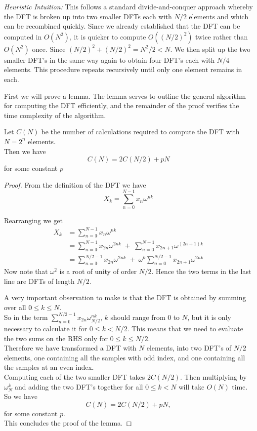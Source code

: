 \noindent\textit{Heuristic Intuition:}\lvm
This follows a standard divide-and-conquer approach whereby the DFT is broken up into two smaller DFTs each with $N/2$ elements and which can be recombined quickly. Since we already established that the DFT can be computed in $O(N^2)$, it is quicker to compute $O((N/2)^2)$ twice rather than $O(N^2)$ once. Since $(N/2)^2 + (N/2)^2 = N^2/2 < N$. We then split up the two smaller DFT's in the same way again to obtain four DFT's each with $N/4$ elements. This procedure repeats recursively until only one element remains in each.

First we will prove a lemma. The lemma serves to outline the general algorithm for computing the DFT efficiently, and the remainder of the proof verifies the time complexity of the algorithm.

\begin{lemma}
    Let $C(N)$ be the number of calculations required to compute the DFT with $N = 2^n$ elements.\\
    Then we have
    \begin{equation}
        C(N) = 2 C(N/2) + pN \label{eq:fftlem}
    \end{equation}
    for some constant $p$
\end{lemma}

\begin{proof}
From the definition of the DFT we have
\[
    X_k = \sum^{N-1}_{n=0}x_n\omega^{nk}
\]

Rearranging we get
\begin{align}
    X_k
    &= \sum^{N-1}_{n=0}x_n\omega^{nk} \nonumber\\
    &= \sum^{N-1}_{n=0}x_{2n}\omega^{2nk} \;+\; \sum^{N-1}_{n=0}x_{2n+1} \omega^{(2n+1)k} \nonumber\\
    &= \sum^{N/2-1}_{n=0}x_{2n}\omega^{2nk} \;+\; \omega^k \sum^{N/2-1}_{n=0}x_{2n+1}\omega^{2nk} \label{eq:keystep}
\end{align}
Now note that $\omega^2$ is a root of unity of order $N/2$. Hence the two terms in the last line are DFTs of length $N/2$.

A very important observation to make is that the DFT is obtained by summing over all $0\leq k \leq N$.\\

So in the term $\sum^{N/2-1}_{n=0}x_{2n}\omega^{nk}_{N/2}$, $k$ should range from $0$ to $N$, but it is only necessary to calculate it for $0 \leq k < N/2$. This means that we need to evaluate the two sums on the RHS only for $0 \leq k \leq N/2$.\\

Therefore we have transformed a DFT with $N$ elements, into two DFT's of $N/2$ elements, one containing all the samples with odd index, and one containing all the samples at an even index.\\
Computing each of the two smaller DFT takes $2C(N/2)$. Then multiplying by $\omega^k_N$ and adding the two DFT's together for all $0 \leq k < N$ will take $O(N)$ time. \\
So we have
\[
    C(N) = 2 C(N/2) + pN, \label{eq:recurse}
\]
for some constant $p$.\\
This concludes the proof of the lemma.
\end{proof}

